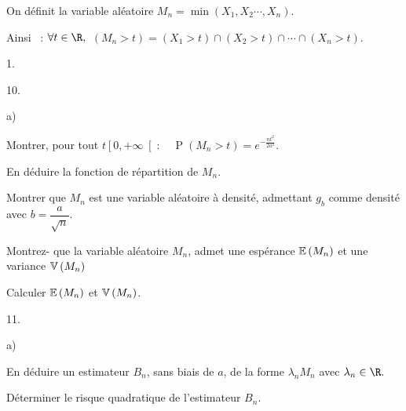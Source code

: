 \documentclass[11pt]{article}%
\begin{document}
On définit la variable aléatoire $M_{n} = \min\left(
X_{1},X_{2}\cdots,X_{n}\right) $.

Ainsi \ : \qquad$\forall t\in\R,$\ $\left( M_{n}>t\right) = \left(
X_{1}>t\right) \cap\left( X_{2}>t\right) \cap\cdots\cap\left(
X_{n}>t\right).$

\begin{noliste}{1.}
 \setlength{\itemsep}{4mm}
\item[10.]
\begin{noliste}{a)}
 \setlength{\itemsep}{2mm}
\item Montrer, pour tout $t\left[ 0, + \infty\right[
:\quad\operatorname{P}\left( M_{n}>t\right) =
e^{-\tfrac{nt^{2}}{2a^{2}}}$.

\item En déduire la fonction de répartition de $M_{n}$.

\item Montrer que $M_{n}$ est une variable aléatoire à densité,
admettant $g_{b}$ comme densité avec $b = \dfrac{a}{\sqrt{n}}.$

\item Montrez- que la variable aléatoire $M_{n}$, admet une espérance
$\mathbb{E}\left( M_{n}\right) $ et une variance $\mathbb{V}\left( M_{n}\right) $

Calculer $\mathbb{E}\left( M_{n}\right) $ et $\mathbb{V}\left( M_{n}\right) $.
\end{noliste}

\item[11.] 

\begin{noliste}{a)}
 \setlength{\itemsep}{2mm}
\item En déduire un estimateur $B_{n}$, sans biais de $a$, de la forme
$\lambda_{n}M_{n}$ avec $\lambda_{n}\in\R.$

\item Déterminer le risque quadratique de l'estimateur $B_{n}$.
\end{noliste}
\end{noliste}
\end{document}
